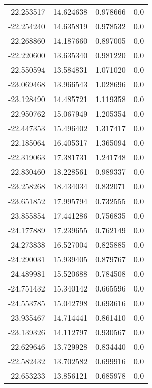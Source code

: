 \begin{tabular}{rrrr}
      -22.253517 &        14.624638 &    0.978666 &   0.0 \\
      -22.254240 &        14.635819 &    0.978532 &   0.0 \\
      -22.268860 &        14.187660 &    0.897005 &   0.0 \\
      -22.220600 &        13.635340 &    0.981220 &   0.0 \\
      -22.550594 &        13.584831 &    1.071020 &   0.0 \\
      -23.069468 &        13.966543 &    1.028696 &   0.0 \\
      -23.128490 &        14.485721 &    1.119358 &   0.0 \\
      -22.950762 &        15.067949 &    1.205354 &   0.0 \\
      -22.447353 &        15.496402 &    1.317417 &   0.0 \\
      -22.185064 &        16.405317 &    1.365094 &   0.0 \\
      -22.319063 &        17.381731 &    1.241748 &   0.0 \\
      -22.830460 &        18.228561 &    0.989337 &   0.0 \\
      -23.258268 &        18.434034 &    0.832071 &   0.0 \\
      -23.651852 &        17.995794 &    0.732555 &   0.0 \\
      -23.855854 &        17.441286 &    0.756835 &   0.0 \\
      -24.177889 &        17.239655 &    0.762149 &   0.0 \\
      -24.273838 &        16.527004 &    0.825885 &   0.0 \\
      -24.290031 &        15.939405 &    0.879767 &   0.0 \\
      -24.489981 &        15.520688 &    0.784508 &   0.0 \\
      -24.751432 &        15.340142 &    0.665596 &   0.0 \\
      -24.553785 &        15.042798 &    0.693616 &   0.0 \\
      -23.935467 &        14.714441 &    0.861410 &   0.0 \\
      -23.139326 &        14.112797 &    0.930567 &   0.0 \\
      -22.629646 &        13.729928 &    0.834440 &   0.0 \\
      -22.582432 &        13.702582 &    0.699916 &   0.0 \\
      -22.653233 &        13.856121 &    0.685978 &   0.0 \\

\end{tabular}
